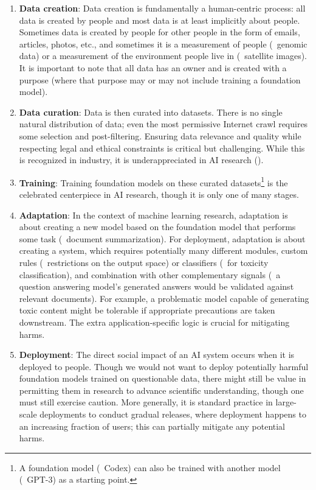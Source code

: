 \begin{enumerate}
  \item \textbf{Data creation}:
    Data creation is fundamentally a human-centric process:
    all data is created by people and most data is at least implicitly about people.
    Sometimes data is created by people for other people in the form of emails, articles, photos, etc.,
    and sometimes it is a measurement of people (\eg~genomic data)
    or a measurement of the environment people live in (\eg~satellite images).
    It is important to note that all data has an owner and is created with a purpose
     (where that purpose may or may not include training a foundation model).

  \item \textbf{Data curation}:
    Data is then curated into datasets.
    There is no single natural distribution of data;
    even the most permissive Internet crawl requires some selection and post-filtering.
    Ensuring data relevance and quality while respecting legal and ethical constraints is critical but challenging.
    While this is recognized in industry, it is underappreciated in AI research ().

  \item \textbf{Training}:
    Training foundation models on these curated datasets\footnote{A foundation model (\eg~Codex) can also be trained with another
    model (\eg~GPT-3) as a starting point.}
    is the celebrated centerpiece in AI research,
    though it is only one of many stages.

  \item \textbf{Adaptation}:
    In the context of machine learning research,
    adaptation is about creating a new model based on the foundation model
    that performs some task (\eg~document summarization).
    For deployment, adaptation is about creating a system,
    which requires potentially many different modules, custom rules
    (\eg~restrictions on the output space) or classifiers (\eg~for toxicity
    classification),
    and combination with other complementary signals (\eg~a question answering
    model's generated answers would be validated against relevant documents).
    For example, a problematic model capable of generating toxic content might be tolerable
    if appropriate precautions are taken downstream.
    The extra application-specific logic is crucial for mitigating harms.

  \item \textbf{Deployment}:
    The direct social impact of an AI system occurs when it is deployed to people.
    Though we would not want to deploy potentially harmful foundation models trained on questionable data,
    there might still be value in permitting them in research to advance scientific understanding,
    though one must still exercise caution.
    More generally, it is standard practice in large-scale deployments
    to conduct gradual releases, where deployment happens to an increasing fraction of users;
    this can partially mitigate any potential harms.
\end{enumerate}

